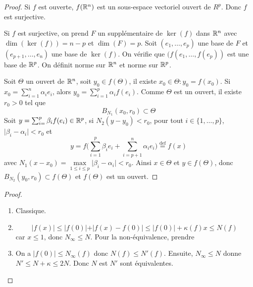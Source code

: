 \begin{proof}
	Si $f$ est ouverte, $f(\mathbb{R}^{n})$ est un sous-espace vectoriel ouvert de $R^{p}$. Donc $f$ est surjective.

	Si $f$ est surjective, on prend $F$ un supplémentaire de $\ker(f)$ dans $\mathbb{R}^{n}$ avec $\dim(\ker(f))=n-p$ et $\dim(F)=p$. Soit $(e_{1},\dots,e_{p})$ une base de $F$ et $(e_{p+1},\dots,e_{n})$ une base de $\ker(f)$. On vérifie que $(f(e_{1},\dots,f(e_{p}))$ est une base de $\mathbb{R}^{p}$. On définit 
	norme sur $\mathbb{R}^{n}$ et 
	norme sur $\mathbb{R}^{p}$.

	Soit $\Theta$ un ouvert de $\mathbb{R}^{n}$, soit $y_{0}\in f(\Theta)$, il existe $x_{0}\in\Theta\colon y_{0}=f(x_{0})$. Si $x_{0}=\sum_{i=1}^{n}\alpha_{i}e_{i}$, alors $y_{0}=\sum_{i=1}^{p}\alpha_{i}f(e_{i})$. Comme $\Theta$ est un ouvert, il existe $r_{0}>0$ tel que 
	\begin{equation}B_{N_{1}}(x_{0},r_{0})\subset\Theta\end{equation}
	Soit $y=\sum_{i=}^{p}\beta_{i}f(e_{i})\in\mathbb{R}^{p}$, si $N_{2}(y-y_{0})<r_{0}$, pour tout $i\in\{1,\dots,p\}$, $\vert\beta_{i}-\alpha_{i}\vert<r_{0}$ et 
	\begin{equation}y=f\Biggl(\sum_{i=1}^{p}\beta_{i}e_{i}+\sum_{i=p+1}^{n}\alpha_{i}e_{i}\Biggr)\overset{\text{def}}{=}f(x)\end{equation}
	avec $N_{1}(x-x_{0})=\max\limits_{1\leqslant i\leqslant p}\vert\beta_{i}-\alpha_{i}\vert<r_{0}$. Ainsi $x\in\Theta$ et $y\in f(\Theta)$, donc $B_{N_{2}}(y_{0},r_{0})\subset f(\Theta)$ et $f(\Theta)$ est un ouvert.
\end{proof}

\begin{proof}
	\phantom{}
	\begin{enumerate}
		\item Classique.
		\item \begin{equation}\vert f(x)\vert\leqslant\vert f(0)\vert+\vert f(x)-f(0)\vert\leqslant\vert f(0)\vert+\kappa(f)x\leqslant N(f)\end{equation}
		car $x\leqslant 1$, donc $N_{\infty}\leqslant N$. Pour la non-équivalence, prendre 
		\item On a $\vert f(0)\vert\leqslant N_{\infty}(f)$ donc $N(f)\leqslant N'(f)$. Ensuite, $N_{\infty}\leqslant N$ donne $N'\leqslant N+\kappa\leqslant 2N$. Donc $N$ est $N'$ sont équivalentes.
	\end{enumerate}
\end{proof}

